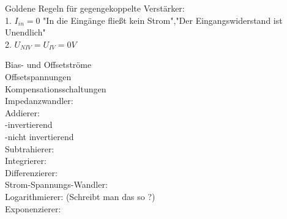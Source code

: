 \documentclass[A4]{scrartcl}
\begin{document}
  Goldene Regeln für gegengekoppelte Verstärker:\\
  1. $I_{in} = 0$ "In die Eingänge fließt kein Strom","Der Eingangswiderstand ist Unendlich"\\
  2. $U_{NIV} = U_{IV} = 0V$ 

  Bias- und Offsetströme\\
  Offsetspannungen\\
  Kompensationsschaltungen\\

  Impedanzwandler:\\
  Addierer:\\
   -invertierend\\
   -nicht invertierend\\
  Subtrahierer:\\
  Integrierer:\\
  Differenzierer:\\
  Strom-Spannungs-Wandler:\\
  Logarithmierer: (Schreibt man das so ?)\\
  Exponenzierer:\\
  
\end{document}
